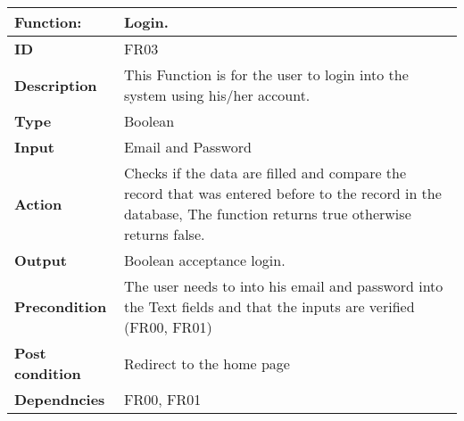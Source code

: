 \documentclass[]{article}
\begin{document}
\FloatBarrier
\begin{table}[h]
\caption{ }
\label{tab:my-table}
\begin{tabular}{|p{}|p{}|}
\hline
\textbf{Function:} & Login.
\\ \hline
\textbf{ID}  &    FR03        

\\ \hline
\textbf{Description}    &       This Function is for the user to login into the system using his/her account.                                                              
\\ \hline
\textbf{Type}    &         Boolean

\\ \hline
\textbf{Input}        & Email and Password


\\ \hline
\textbf{Action}            & Checks if the data are filled and compare the record that was entered before to the record in the database, The function returns true otherwise returns false.

\\ \hline
\textbf{Output}            & Boolean acceptance login.

\\ \hline
\textbf{Precondition}           &   The user needs to into his email and password into the Text fields and that the inputs are verified (FR00, FR01)

\\ \hline
\textbf{Post condition}           & Redirect to the home page


\\ \hline
\textbf{Dependncies}           & FR00, FR01
\\ \hline
\end{tabular}
\end{table}
\end{document}
